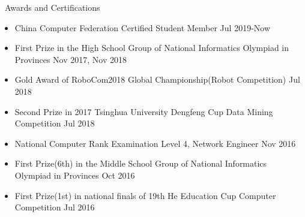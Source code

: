 \documentclass{resume}
\begin{document}
\begin{rSection}{\faAward~Awards and Certifications}
    \begin{itemize}
        \itemsep -0.5em

        \item China Computer Federation Certified Student Member \hfill Jul 2019-Now

        \item First Prize in the High School Group of National Informatics Olympiad in Provinces \hfill Nov 2017, Nov 2018
        \item Gold Award of RoboCom2018 Global Championship(Robot Competition) \hfill Jul 2018
        \item Second Prize in 2017 Tsinghua University Dengfeng Cup Data Mining Competition \hfill Jul 2018
        \item National Computer Rank Examination Level 4, Network Engineer \hfill Nov 2016
        \item First Prize(6th) in the Middle School Group of National Informatics Olympiad in Provinces \hfill Oct 2016
        \item First Prize(1st) in national finals of 19th He Education Cup Computer Competition \hfill Jul 2016
        
    \end{itemize}
\end{rSection}
\end{document}
